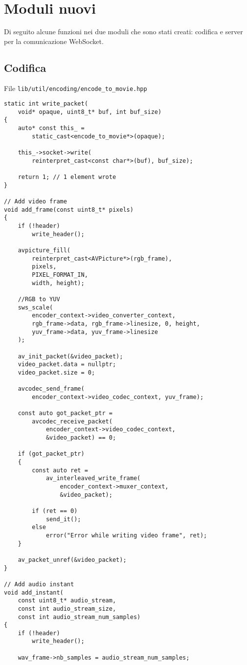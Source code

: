 \section{Moduli nuovi}
Di seguito alcune funzioni nei due moduli che sono stati creati: codifica e server per la comunicazione WebSocket.


\subsection{Codifica}
File \verb|lib/util/encoding/encode_to_movie.hpp|

\begin{verbatim}
static int write_packet(
	void* opaque, uint8_t* buf, int buf_size)
{
	auto* const this_ = 
		static_cast<encode_to_movie*>(opaque);

	this_->socket->write(
		reinterpret_cast<const char*>(buf), buf_size);

	return 1; // 1 element wrote
}

// Add video frame
void add_frame(const uint8_t* pixels)
{
	if (!header)
		write_header();

	avpicture_fill(
		reinterpret_cast<AVPicture*>(rgb_frame),
		pixels,
		PIXEL_FORMAT_IN,
		width, height);

	//RGB to YUV
	sws_scale(
		encoder_context->video_converter_context,
		rgb_frame->data, rgb_frame->linesize, 0, height,
		yuv_frame->data, yuv_frame->linesize
	);

	av_init_packet(&video_packet);
	video_packet.data = nullptr;
	video_packet.size = 0;

	avcodec_send_frame(
		encoder_context->video_codec_context, yuv_frame);

	const auto got_packet_ptr = 
		avcodec_receive_packet(
			encoder_context->video_codec_context, 
			&video_packet) == 0;

	if (got_packet_ptr)
	{
		const auto ret = 
			av_interleaved_write_frame(
				encoder_context->muxer_context, 
				&video_packet);

		if (ret == 0)
			send_it();
		else
			error("Error while writing video frame", ret);
	}

	av_packet_unref(&video_packet);
}

// Add audio instant
void add_instant(
	const uint8_t* audio_stream, 
	const int audio_stream_size, 
	const int audio_stream_num_samples)
{
	if (!header)
		write_header();

	wav_frame->nb_samples = audio_stream_num_samples;


\end{verbatim}
